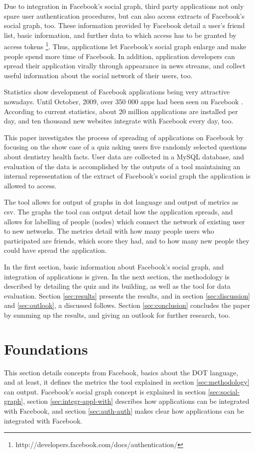 \documentclass[preprint,12pt]{elsarticle}
\begin{document}
Due to integration in Facebook's social graph, third party
applications not only spare user authentication procedures, but can also access
extracts of Facebook's social graph, too. These information provided
by Facebook detail a user's friend list, basic information, and
further data to which access has to be granted by access tokens
\footnote{http://developers.facebook.com/docs/authentication/}. Thus,
applications let Facebook's social graph enlarge and make people
spend more time of Facebook. In addition, application developers
can spread their application virally through appearance in news
streams, and collect useful information about the social network of
their users, too.

Statistics show development of Facebook applications being very
attractive nowadays. Until October, 2009, 
over 350 000 apps had been seen on Facebook \cite{facebookBlog}.
According to current statistics, about 20 million applications are
installed per day, and ten thousand new websites integrate with
Facebook every day, too. \cite{facebookStats} 

This paper investigates the process of spreading of applications on
Facebook by focusing on the show case of a quiz asking users five randomly
selected questions about dentistry health facts. User data are
collected in a MySQL database, and evaluation of the data is
accomplished by the outputs of a tool maintaining an internal representation of the extract of Facebook's
social graph the application is allowed to access.

The tool allows for output of graphs in \ac{dot} language and output of
metrics as \ac{csv}. The graphs the tool can output detail how the application
spreads, and allows for labelling of people (nodes) which connect the
network of existing user to new networks. The metrics detail with how
many people users who participated are friends, which score they had,
and to how many new people they could have spread the application.

In the first section, basic information about Facebook's social graph,
and integration of applications is
given. In the next section, the methodology is described by detailing
the quiz and its building, as well as the tool for data evaluation. Section
\ref{sec:results} presents the results, and in section
\ref{sec:discussion} and \ref{sec:outlook}, a discussed follows. Section
\ref{sec:conclusion} concludes the paper by summing up the results,
and giving an outlook for further research, too.


\section{Foundations}
\label{sec:background}
This section details concepts from Facebook, basics about the
\ac{DOT} language, and at least, it defines the metrics the tool
explained in section \ref{sec:methodology} can output. Facebook's
social graph concept is explained in 
section \ref{sec:social-graph}, section \ref{sec:integr-appl-with}
describes how applications can be integrated with Facebook, and
section \ref{sec:auth-auth} makes clear how applications can be
integrated with Facebook.
\end{document}

